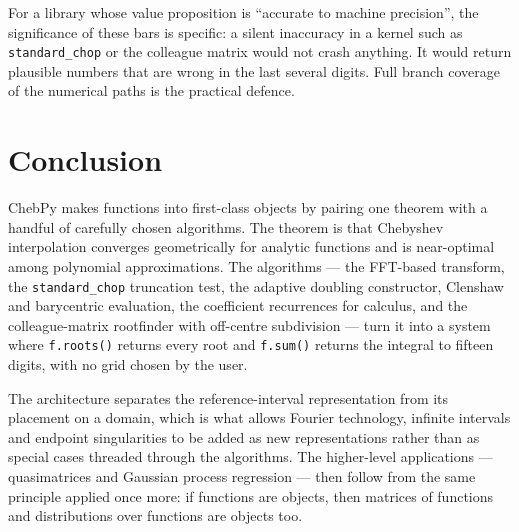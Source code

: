 \documentclass[11pt,a4paper]{article}
\newcommand{\code}[1]{\texttt{#1}}
\begin{document}
For a library whose value proposition is ``accurate to machine precision'', the
significance of these bars is specific: a silent inaccuracy in a kernel such as
\code{standard\_chop} or the colleague matrix would not crash anything. It
would return plausible numbers that are wrong in the last several digits. Full
branch coverage of the numerical paths is the practical defence.

\section{Conclusion}

ChebPy makes functions into first-class objects by pairing one theorem with a
handful of carefully chosen algorithms. The theorem is that Chebyshev
interpolation converges geometrically for analytic functions and is
near-optimal among polynomial approximations. The algorithms --- the FFT-based
transform, the \code{standard\_chop} truncation test, the adaptive doubling
constructor, Clenshaw and barycentric evaluation, the coefficient recurrences
for calculus, and the colleague-matrix rootfinder with off-centre subdivision
--- turn it into a system where \code{f.roots()} returns every root and
\code{f.sum()} returns the integral to fifteen digits, with no grid chosen by
the user.

The architecture separates the reference-interval representation from its
placement on a domain, which is what allows Fourier technology, infinite
intervals and endpoint singularities to be added as new representations rather
than as special cases threaded through the algorithms. The higher-level
applications --- quasimatrices and Gaussian process regression --- then follow
from the same principle applied once more: if functions are objects, then
matrices of functions and distributions over functions are objects too.
\end{document}
